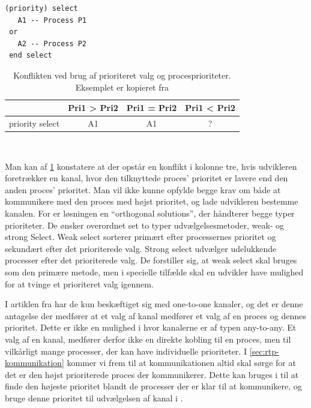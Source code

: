 \begin{lstlisting}[firstnumber=1 ,float=hbtp, label=lst:pri-select, caption={(priority) select. Eksemplet er kopieret fra \cite{Burns1990}}]
(priority) select
   A1 -- Process P1
 or
   A2 -- Process P2
 end select
\end{lstlisting}

\begin{table}[htbp]
	\centering
	\begin{tabular}{lccc}
       	\toprule
                        & Pri1 > Pri2 & Pri1 = Pri2 & Pri1 < Pri2\\
        \midrule
	    priority select & A1          & A1          & ?  \\
        \bottomrule
        \end{tabular}
    \caption[]{Konflikten ved brug af prioriteret valg og procesprioriteter. Eksemplet er kopieret fra \cite[160]{Burns1990}}\\
    \label{tab:prioritizedSelect}
\end{table}

Man kan af \cref{tab:prioritizedSelect}  konstatere at der opstår en konflikt i kolonne tre, hvis udvikleren foretrækker en kanal, hvor den  tilknyttede proces' prioritet er lavere  end den anden proces'  prioritet. Man vil ikke kunne opfylde begge krav om både at kommunikere med den proces med højst prioritet, og lade udvikleren bestemme kanalen. For \citeauthor{Burns1990} er løsningen en ``orthogonal solutions'', der håndterer begge typer prioriteter. De ønsker overordnet set to typer udvælgelsesmetoder, weak- og strong Select. Weak select sorterer primært efter processernes prioritet og sekundært efter det prioriterede valg. Strong select udvælger udelukkende processer efter det prioriterede valg. De forstiller sig, at weak select skal bruges som den primære metode, men i specielle tilfælde skal en udvikler have mulighed for at tvinge et prioriteret valg igennem.

I artiklen fra \citeauthor{Burns1990} har de kun beskæftiget sig med one-to-one kanaler, og det er denne antagelse der medfører at et valg af kanal medfører et valg af en proces og dennes prioritet. Dette er ikke en mulighed i \pycsp hvor kanalerne er af typen any-to-any. Et valg af en kanal, medfører derfor ikke en direkte kobling til en proces, men til vilkårligt mange processer, der kan have individuelle  prioriteter. I \cref{sec:rtp-kommunikation} kommer vi frem til at kommunikationen altid skal sørge for at det er den højst prioriterede proces der kommunikerer. Dette kan bruges i  til at finde den højeste prioritet blandt de processer der er klar til at kommunikere, og bruge denne prioritet til udvælgelsen af kanal i .

